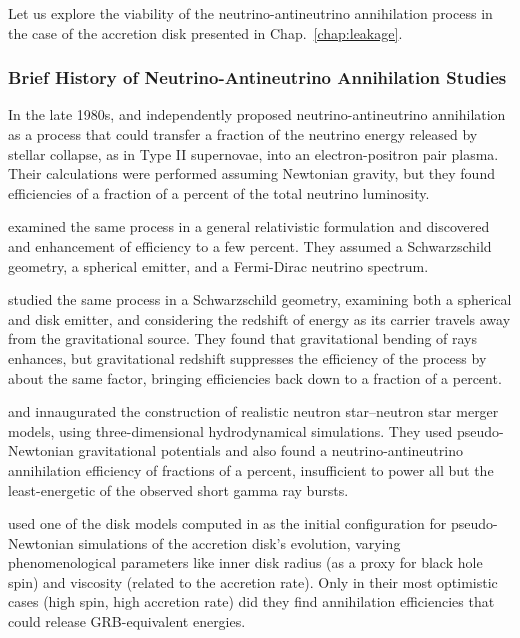 Let us explore the viability of the neutrino-antineutrino annihilation process
in the case of the accretion disk presented in Chap.~\ref{chap:leakage}.

\subsubsection{Brief History of Neutrino-Antineutrino Annihilation Studies}
\label{sssc:nunubar_review}
In the late 1980s, \cite{good1987-nunubar} and \cite{bere1987-nunubar}
independently proposed neutrino-antineutrino annihilation as a process that could
transfer a fraction of the neutrino energy released by stellar collapse, as in
Type II supernovae, into an electron-positron pair plasma. Their calculations
were performed assuming Newtonian gravity, but they found efficiencies of a
fraction of a percent of the total neutrino luminosity.

\cite{salm1999-nunubar} examined the same process in a general relativistic
formulation and discovered and enhancement of efficiency to a few percent.
They assumed a Schwarzschild geometry, a spherical emitter, and a Fermi-Dirac
neutrino spectrum.

\cite{asan2000-nunubar} studied the same process in a Schwarzschild geometry,
examining both a spherical and disk emitter, and considering the
redshift of energy as its carrier travels away from the gravitational source.
They found that gravitational bending of rays enhances, but gravitational
redshift suppresses the efficiency of the process by about the same factor,
bringing efficiencies back down to a fraction of a percent.

\cite{ruff1999-nsns_i,ruff1999-nsns_ii,ruff1999-nsns_iii} and
\cite{ross2003-nsns_i,ross2003-nsns_ii,ross2003-nsns_iii} innaugurated the
construction of realistic neutron star--neutron star merger models, using
three-dimensional hydrodynamical simulations.
They used pseudo-Newtonian gravitational potentials and also found a
neutrino-antineutrino annihilation efficiency of fractions of a percent,
insufficient to power all but the least-energetic of the observed
short gamma ray bursts.

\cite{seti2006-nunubar} used one of the disk models computed in
\cite{ruff1999-nsns_i}
as the initial configuration for pseudo-Newtonian simulations of the
accretion disk's evolution, varying phenomenological parameters like inner disk
radius (as a proxy for black hole spin) and viscosity (related to the
accretion rate). Only in their most optimistic cases (high spin, high
accretion rate) did they find annihilation
efficiencies that could release GRB-equivalent energies.

